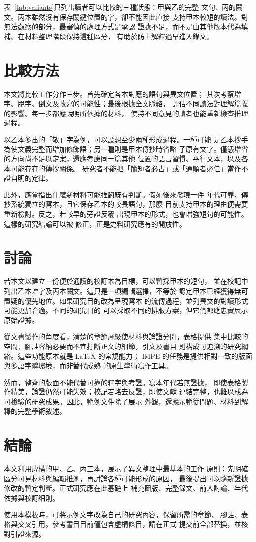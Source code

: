 \documentclass[lang=zh]{impeart}
\begin{document}
表~\ref{tab:variants}只列出讀者可以比較的三種狀態：甲與乙的完整
文句、丙的闕文。丙本雖然沒有保存關鍵位置的字，卻不能因此直接
支持甲本較短的讀法。對無法觀察的部分，最審慎的處理方式是承認
證據不足，而不是由其他版本代為填補。在材料整理階段保持這種區分，
有助於防止解釋過早進入錄文。

\section{比較方法}\label{sec:method}
本文將比較工作分作三步。首先確定各本對應的語句與異文位置；
其次考察增字、脫字、倒文及改寫的可能性；最後根據全文脈絡，
評估不同讀法對理解篇義的影響。每一步都應說明所依據的材料，
使持不同意見的讀者也能重新檢查推理過程。

以乙本多出的「敬」字為例，可以設想至少兩種形成過程。一種可能
是乙本抄手為使文義完整而增加修飾語；另一種則是甲本傳抄時省略
了原有文字。僅憑增省的方向尚不足以定案，還應考慮同一篇其他
位置的語言習慣、平行文本，以及各本可能存在的傳抄關係。
研究者不能把「簡短者必古」或「通順者必佳」當作不證自明的定律。

此外，應當指出什麼新材料可能推翻既有判斷。假如後來發現一件
年代可靠、傳抄系統獨立的寫本，且它保存乙本的較長語句，那麼
目前支持甲本的理由便需要重新檢討。反之，若較早的旁證反覆
出現甲本的形式，也會增強短句的可能性。這樣的研究結論可以被
修正，正是史料研究應有的開放性。

\section{討論}\label{sec:discussion}
若本文以建立一份便於通讀的校訂本為目標，可以暫採甲本的短句，
並在校記中列出乙本增字及丙本闕文。這只是一項編輯選擇，不等於
認定甲本已經獲得無可置疑的優先地位。如果研究目的改為呈現寫本
的流傳過程，並列異文的對讀形式可能更加合適。不同的研究目的
可以採取不同的排版方案，但它們都應忠實展示原始證據。

從文書製作的角度看，清楚的章節層級使材料與論證分開，表格提供
集中比較的空間，腳註容納必要而不宜打斷正文的細節，引文及書目
則構成可追溯的研究網絡。這些功能原本就是 \LaTeX{} 的常規能力；
IMPE 的任務是提供相對一致的版面與多語字體環境，而非替代成熟
的原生學術寫作工具。

然而，整齊的版面不能代替可靠的釋字與考證。寫本年代若無證據，
即使表格製作精美，論證仍然可能失效；校記若略去反證，即使文獻
連結完整，也難以成為可檢驗的研究成果。因此，範例文件除了展示
外觀，還應示範從問題、材料到解釋的完整學術敘述。

\section{結論}\label{sec:conclusion}
本文利用虛構的甲、乙、丙三本，展示了異文整理中最基本的工作
原則：先明確區分可見材料與編輯推測，再討論各種可能形成的原因，
最後提出可以隨新證據修改的暫定判斷。正式研究應在此基礎上
補充圖版、完整錄文、前人討論、年代依據與校訂細則。

使用本模板時，可將示例文字改為自己的研究內容，保留所需的章節、
腳註、表格與交叉引用。參考書目目前僅包含虛構條目，請在正式
提交前全部替換，並核對引證來源\cite{sample2026}。

\printbibliography
\end{document}
